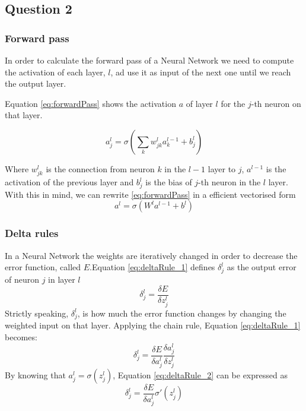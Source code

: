 \documentclass[11pt]{article}
\begin{document}
\subsection{Question 2}
\subsubsection{Forward pass}
In order to calculate the forward pass of a Neural Network we need to compute the activation of each layer, $l$, ad use it as input of the next one until we reach the output layer. 

Equation \ref{eq:forwardPass} shows the activation $a$ of layer $l$ for the $j$-th neuron on that layer.

\begin{equation}
\label{eq:forwardPass}
a^l_j = \sigma(\sum_k w^l_{jk}a^{l-1}_k + b^l_j)
\end{equation}

Where $w^l_{jk}$ is the connection from neuron $k$ in the $l-1$ layer to $j$, $a^{l-1}$ is the activation of the previous layer and $b^l_j$ is the bias of $j$-th neuron in the $l$ layer. With this in mind, we can rewrite \ref{eq:forwardPass} in a efficient vectorised form
\begin{equation}
\label{eq:forwardPassVectorized}
a^l = \sigma(W^la^{l-1} + b^l)
\end{equation}

\subsubsection{Delta rules}
In a Neural Network the weights are iteratively changed in order to decrease the error function, called $E$.Equation \ref{eq:deltaRule_1} defines $\delta^l_j$ as the output error of neuron $j$ in layer $l$
\begin{equation}
	\label{eq: deltaRule_1}
	\delta^l_j = \frac{\delta E}{\delta z^l_j}
\end{equation}
Strictly speaking, $\delta^l_j$, is how much the error function changes by changing the weighted input on that layer. Applying the chain rule, Equation \ref{eq:deltaRule_1} becomes:
\begin{equation}
\label{eq:deltaRule_2}
\delta^l_j = \frac{\delta E}{\delta a^l_j} \frac{\delta a^l_j}{\delta z^l_j}
\end{equation}
By knowing that $a^l_j = \sigma(z^l_j)$, Equation \ref{eq:deltaRule_2} can be expressed as
\begin{equation}
\label{eq:deltaRule}	
\delta^l_j = \frac{\delta E}{\delta a^l_j} \sigma'(z^l_j)
\end{equation}  
\end{document}
